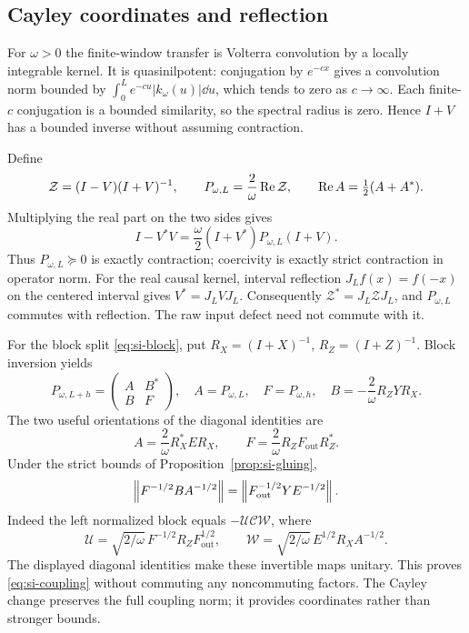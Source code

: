 \subsection{Cayley coordinates and reflection}

For $\omega>0$ the finite-window transfer is Volterra convolution
by a locally integrable kernel. It is quasinilpotent: conjugation
by $e^{-cx}$ gives a convolution norm bounded by
$\int_0^L e^{-cu}|k_\omega(u)|\dd u$, which tends to zero as
$c\to\infty$. Each finite-$c$ conjugation is a bounded similarity,
so the spectral radius is zero. Hence $I+V$ has a bounded inverse
without assuming contraction.

Define
\begin{equation}
 \mathcal Z=(I-V)(I+V)^{-1},\qquad
 P_{\omega,L}=\frac2\omega\operatorname{Re}\mathcal Z,\qquad
 \operatorname{Re} A=\tfrac12(A+A^*).
\end{equation}
Multiplying the real part on the two sides gives
\begin{equation}\label{eq:si-congruence}
 I-V^*V=\frac\omega2(I+V^*)P_{\omega,L}(I+V).
\end{equation}
Thus $P_{\omega,L}\succeq0$ is exactly contraction; coercivity
is exactly strict contraction in operator norm.
For the real causal kernel, interval reflection
$J_Lf(x)=f(-x)$ on the centered interval gives
$V^*=J_LVJ_L$. Consequently $\mathcal Z^*=J_L\mathcal ZJ_L$,
and $P_{\omega,L}$ commutes with reflection. The raw input
defect need not commute with it.

For the block split \eqref{eq:si-block}, put
$R_X=(I+X)^{-1}$, $R_Z=(I+Z)^{-1}$. Block inversion yields
\begin{equation}
 P_{\omega,L+h}=\begin{pmatrix}A&B^*\\B&F\end{pmatrix},
 \quad A=P_{\omega,L},\quad F=P_{\omega,h},\quad
 B=-\frac2\omega R_ZYR_X.
\end{equation}
The two useful orientations of the diagonal identities are
\begin{equation}
 A=\frac2\omega R_X^*ER_X,\qquad
 F=\frac2\omega R_ZF_{\mathrm{out}}R_Z^*.
\end{equation}
Under the strict bounds of Proposition~\ref{prop:si-gluing},
\begin{equation}\label{eq:si-coupling}
 \left\lVert F^{-1/2}BA^{-1/2}\right\rVert
 =\left\lVert F_{\mathrm{out}}^{-1/2}YE^{-1/2}\right\rVert.
\end{equation}
Indeed the left normalized block equals $-\mathcal U\mathcal C\mathcal W$,
where
\[
 \mathcal U=\sqrt{2/\omega}\,F^{-1/2}R_ZF_{\mathrm{out}}^{1/2},
 \qquad
 \mathcal W=\sqrt{2/\omega}\,E^{1/2}R_XA^{-1/2}.
\]
The displayed diagonal identities make these invertible maps
unitary. This proves \eqref{eq:si-coupling} without commuting any
noncommuting factors. The Cayley change preserves the full
coupling norm; it provides coordinates rather than stronger bounds.

